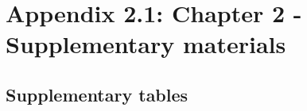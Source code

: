 \chapter[Appendix 2.1: Chapter 2 - Supplementary materials]{Appendix 2.1: Chapter 2 - Supplementary materials}\label{ch:Appendix2.1}

\renewcommand{\thefigure}{A.2.1.\arabic{figure}}
\setcounter{figure}{0}

\renewcommand{\thetable}{A.2.1.\arabic{table}}
\setcounter{table}{0}

\section*{Supplementary tables}

